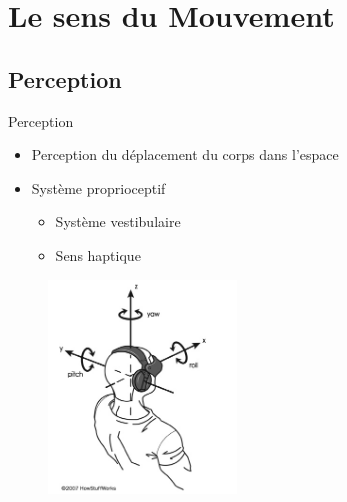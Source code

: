 \section{Le sens du Mouvement}
\subsection{Perception}
\begin{frame}{Perception}
\begin{multicols}{2}
\begin{itemize}
\item Perception du déplacement du corps dans l'espace
\item Système proprioceptif
\begin{itemize}
\item Système vestibulaire
\item Sens haptique
\end{itemize}
\end{itemize}
\begin{figure}
\centering
\includegraphics[width=5cm]{images/dof}
\end{figure}
\end{multicols}
\end{frame}

